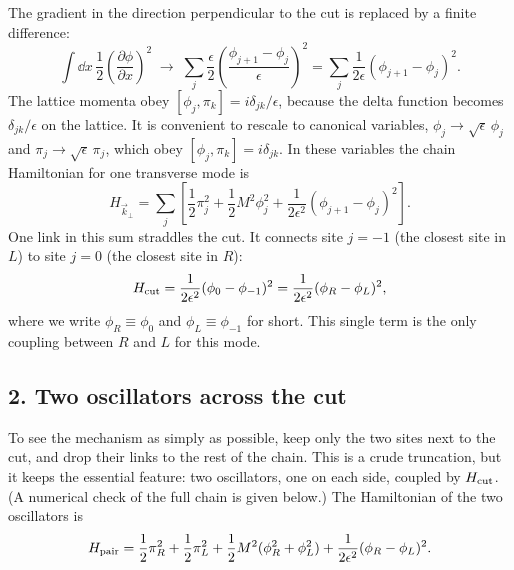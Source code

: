 The gradient in the direction perpendicular to the cut is replaced by a finite difference:
\begin{equation}
\int \dd x \, \frac{1}{2}\left(\frac{\partial\phi}{\partial x}\right)^2 \;\longrightarrow\;
\sum_j \frac{\epsilon}{2} \left( \frac{\phi_{j+1} - \phi_j}{\epsilon} \right)^2
= \sum_j \frac{1}{2\epsilon} (\phi_{j+1} - \phi_j)^2 .
\label{eq:lattice_gradient_sum}
\end{equation}
The lattice momenta obey $[\phi_j,\pi_k]=i\delta_{jk}/\epsilon$, because the delta function becomes
$\delta_{jk}/\epsilon$ on the lattice. It is convenient to rescale to canonical variables,
$\phi_j\to\sqrt\epsilon\,\phi_j$ and $\pi_j\to\sqrt\epsilon\,\pi_j$, which obey $[\phi_j,\pi_k]=i\delta_{jk}$.
In these variables the chain Hamiltonian for one transverse mode is
\begin{equation}
H_{\vec k_\perp} = \sum_j \left[ \frac12\pi_j^2 + \frac12 M^2\phi_j^2 + \frac{1}{2\epsilon^2}(\phi_{j+1}-\phi_j)^2 \right] .
\label{eq:lattice_chain_hamiltonian}
\end{equation}
One link in this sum straddles the cut. It connects site $j = -1$ (the closest site in $L$) to site $j = 0$
(the closest site in $R$):
\begin{equation}
H_{\rm cut} = \frac{1}{2\epsilon^2} (\phi_0 - \phi_{-1})^2 = \frac{1}{2\epsilon^2} (\phi_R - \phi_L)^2 ,
\label{eq:h_cut_interaction}
\end{equation}
where we write $\phi_R \equiv \phi_0$ and $\phi_L \equiv \phi_{-1}$ for short. This single term is the only
coupling between $R$ and $L$ for this mode.

\subsection*{2. Two oscillators across the cut}

To see the mechanism as simply as possible, keep only the two sites next to the cut, and drop their links to
the rest of the chain. This is a crude truncation, but it keeps the essential feature: two oscillators, one on
each side, coupled by $H_{\rm cut}$. (A numerical check of the full chain is given below.) The Hamiltonian of
the two oscillators is
\begin{equation}
H_{\rm pair} = \frac{1}{2}\pi_R^2 + \frac{1}{2}\pi_L^2 + \frac{1}{2}M^2(\phi_R^2 + \phi_L^2)
+ \frac{1}{2\epsilon^2}(\phi_R - \phi_L)^2 .
\label{eq:pair_hamiltonian}
\end{equation}

